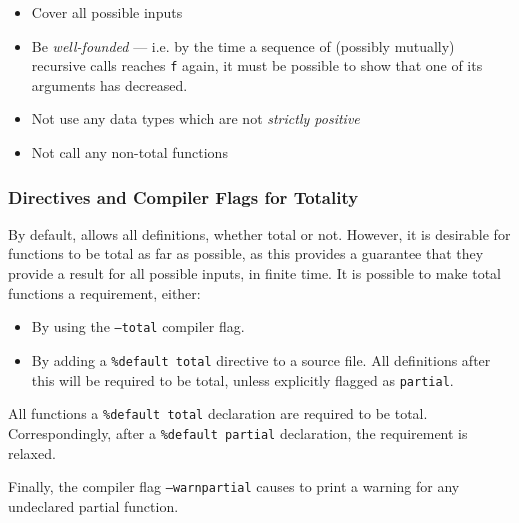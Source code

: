 \begin{itemize}
\item Cover all possible inputs
\item Be \emph{well-founded} --- i.e. by the time a sequence of 
(possibly mutually) recursive calls reaches \texttt{f} again, it must
be possible to show that one of its arguments has decreased.
\item Not use any data types which are not \emph{strictly positive}
\item Not call any non-total functions
\end{itemize}

\subsubsection{Directives and Compiler Flags for Totality}

By default, \Idris{} allows all definitions, whether total or not. However,
it is desirable for functions to be total as far as possible, as this
provides a guarantee that they provide a result for all possible inputs,
in finite time. It is possible to make total functions a requirement,
either:

\begin{itemize}
\item By using the \texttt{--total} compiler flag.
\item By adding a \texttt{\%default total} directive to a source file.
All definitions after this will be required to be total, unless
explicitly flagged as \texttt{partial}.
\end{itemize}

\noindent
All functions  a \texttt{\%default total} declaration are required
to be total. Correspondingly, after a \texttt{\%default partial} declaration,
the requirement is relaxed.

Finally, the compiler flag \texttt{--warnpartial} causes \Idris{} to print
a warning for any undeclared partial function.
